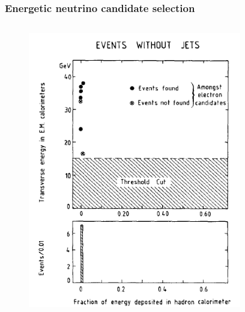 \documentclass[xcolor=table]{beamer}
\begin{document}

\begin{frame}
\frametitle{Energetic neutrino candidate selection}
\fontsize{12pt}{12}\selectfont

\begin{columns}

\begin{figure}[h]
\centering
\includegraphics[width=0.85\textwidth]{images/neutrino-without-jets.png}
\end{figure}




\end{columns}
\end{frame}
\end{document}
